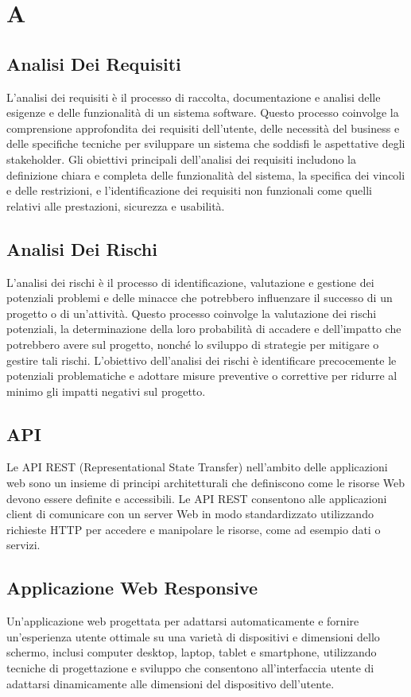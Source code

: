 \section*{A} 
\subsection*{Analisi Dei Requisiti} 
L'analisi dei requisiti è il processo di raccolta, documentazione e analisi delle esigenze e delle funzionalità di un sistema software. Questo processo coinvolge la comprensione approfondita dei requisiti dell'utente, delle necessità del business e delle specifiche tecniche per sviluppare un sistema che soddisfi le aspettative degli stakeholder. Gli obiettivi principali dell'analisi dei requisiti includono la definizione chiara e completa delle funzionalità del sistema, la specifica dei vincoli e delle restrizioni, e l'identificazione dei requisiti non funzionali come quelli relativi alle prestazioni, sicurezza e usabilità.
\subsection*{Analisi Dei Rischi} 
L'analisi dei rischi è il processo di identificazione, valutazione e gestione dei potenziali problemi e delle minacce che potrebbero influenzare il successo di un progetto o di un'attività. Questo processo coinvolge la valutazione dei rischi potenziali, la determinazione della loro probabilità di accadere e dell'impatto che potrebbero avere sul progetto, nonché lo sviluppo di strategie per mitigare o gestire tali rischi. L'obiettivo dell'analisi dei rischi è identificare precocemente le potenziali problematiche e adottare misure preventive o correttive per ridurre al minimo gli impatti negativi sul progetto.
\subsection*{API} 
Le API REST (Representational State Transfer) nell'ambito delle applicazioni web sono un insieme di principi architetturali che definiscono come le risorse Web devono essere definite e accessibili. Le API REST consentono alle applicazioni client di comunicare con un server Web in modo standardizzato utilizzando richieste HTTP per accedere e manipolare le risorse, come ad esempio dati o servizi.
\subsection*{Applicazione Web Responsive} 
Un'applicazione web progettata per adattarsi automaticamente e fornire un'esperienza utente ottimale su una varietà di dispositivi e dimensioni dello schermo, inclusi computer desktop, laptop, tablet e smartphone, utilizzando tecniche di progettazione e sviluppo che consentono all'interfaccia utente di adattarsi dinamicamente alle dimensioni del dispositivo dell'utente.
